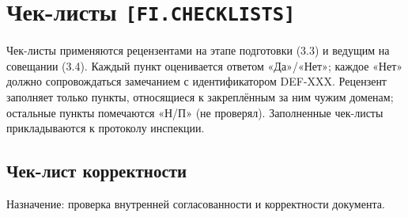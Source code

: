 \documentclass[12pt,a4paper]{article}
\begin{document}
\section{Чек-листы \texttt{[FI.CHECKLISTS]}}
\label{sec:checklists}

Чек-листы применяются рецензентами на этапе подготовки (3.3) и ведущим на
совещании (3.4). Каждый пункт оценивается ответом «Да»/«Нет»; каждое «Нет»
должно сопровождаться замечанием с идентификатором DEF-XXX. Рецензент заполняет
только пункты, относящиеся к закреплённым за ним чужим доменам; остальные
пункты помечаются «Н/П» (не проверял). Заполненные чек-листы прикладываются к
протоколу инспекции.

\subsection{Чек-лист корректности}

Назначение: проверка внутренней согласованности и корректности документа.
\end{document}
